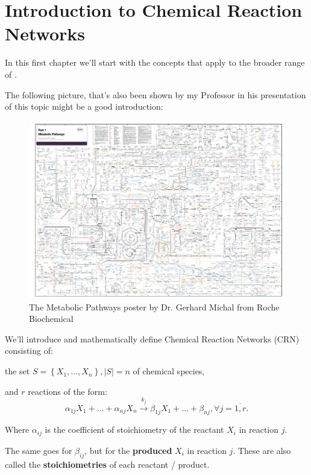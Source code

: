 \chapter{Introduction to Chemical Reaction Networks}\label{chap:ch1}

In this first chapter we'll start with the concepts that apply to the broader range of .

The following picture, that's also been shown by my Professor in his presentation of this topic \parencite{Lorand2024} might be a good introduction:

\begin{figure}[H]
	\centering
	\includegraphics[width=\textwidth]{chem-pics/metabolic-pathways.png}	
	\caption{The Metabolic Pathways poster by Dr. Gerhard Michal from Roche Biochemical \cite{RouchePathways}}
	\label{fig:metabolic-pathways}
\end{figure}

We'll introduce and mathematically define Chemical Reaction Networks (CRN) consisting of:

the set $S = \left\{ X_1, \dots, X_n \right\}, \left| S \right| = n$ of chemical species,

and $r$ reactions of the form:
\begin{equation}\label{mass-action_network}
	\alpha_{1j} X_1 + \dots + \alpha_{n j} X_n \xrightarrow{k_j} \beta_{1j} X_1 + \dots + \beta_{n j}, \forall j = \overline{1,r}.	
\end{equation}

Where $\alpha_{ij}$ is the coefficient of stoichiometry of the reactant $X_i$ in reaction $j$.

The same goes for $\beta_{ij}$, but for the \textbf{produced} $X_i$ in reaction $j$. These are also called the \textbf{stoichiometries} of each reactant / product.

